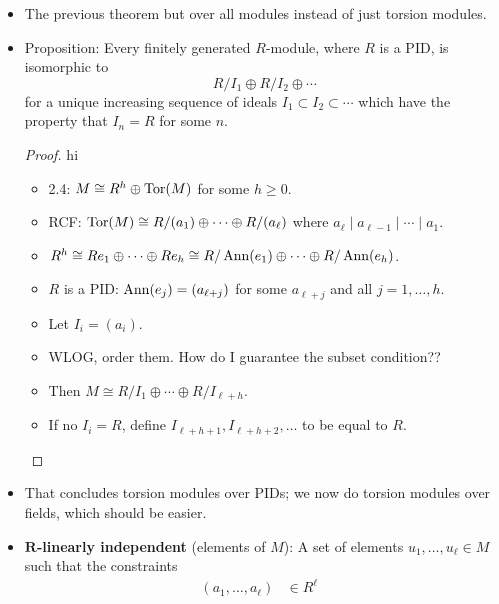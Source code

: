 \documentclass[../notes.tex]{subfiles}
\begin{document}
\begin{itemize}
\begin{proof}[Proof of theorem]
\begin{align*}
            &\cong \left( \bigoplus_{i=1}^\ell R/(p_i^{m_i,1}) \right)\oplus\cdots\oplus\left( \bigoplus_{i=1}^\ell R/(p_i^{m_i,s_\ell}) \right)\\
            &\cong R/(a_1)\oplus\cdots\oplus R/(a_{s_\ell})
        \end{align*}
        as desired.
    \end{proof}
    \item The previous theorem but over all modules instead of just torsion modules.
    \item Proposition: Every finitely generated $R$-module, where $R$ is a PID, is isomorphic to
    \begin{equation*}
        R/I_1\oplus R/I_2\oplus\cdots
    \end{equation*}
    for a unique increasing sequence of ideals $I_1\subset I_2\subset\cdots$ which have the property that $I_n=R$ for some $n$.
    \begin{proof}
        {\color{white}hi}
        \begin{itemize}
            \item 2.4: $M\cong R^h\oplus\operatorname{Tor}(M)$ for some $h\geq 0$.
            \item RCF: $\operatorname{Tor}(M)\cong R/(a_1)\oplus\cdots\oplus R/(a_\ell)$ where $a_\ell\mid a_{\ell-1}\mid\cdots\mid a_1$.
            \item $R^h\cong Re_1\oplus\cdots\oplus Re_h\cong R/\operatorname{Ann}(e_1)\oplus\cdots\oplus R/\operatorname{Ann}(e_h)$.
            \item $R$ is a PID: $\operatorname{Ann}(e_j)=(a_{\ell+j})$ for some $a_{\ell+j}$ and all $j=1,\dots,h$.
            \item Let $I_i=(a_i)$.
            \item WLOG, order them. How do I guarantee the subset condition??
            \item Then $M\cong R/I_1\oplus\cdots\oplus R/I_{\ell+h}$.
            \item If no $I_i=R$, define $I_{\ell+h+1},I_{\ell+h+2},\dots$ to be equal to $R$.
        \end{itemize}
    \end{proof}
    \item That concludes torsion modules over PIDs; we now do torsion modules over fields, which should be easier.
    \item \textbf{$\bm{R}$-linearly independent} (elements of $M$): A set of elements $u_1,\dots,u_\ell\in M$ such that the constraints
    \begin{align*}
        (a_1,\dots,a_\ell) &\in R^\ell&

\end{align*}
\end{itemize}
\end{document}
